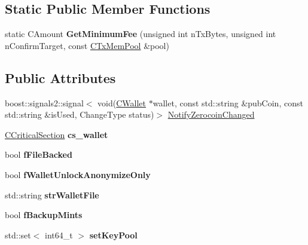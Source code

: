 \subsection*{Static Public Member Functions}
\begin{DoxyCompactItemize}
\item 
static C\+Amount {\bfseries Get\+Minimum\+Fee} (unsigned int n\+Tx\+Bytes, unsigned int n\+Confirm\+Target, const \mbox{\hyperlink{class_c_tx_mem_pool}{C\+Tx\+Mem\+Pool}} \&pool)
\end{DoxyCompactItemize}
\subsection*{Public Attributes}
\begin{DoxyCompactItemize}
\item 
boost\+::signals2\+::signal$<$ void(\mbox{\hyperlink{class_c_wallet}{C\+Wallet}} $\ast$wallet, const std\+::string \&pub\+Coin, const std\+::string \&is\+Used, Change\+Type status)$>$ \mbox{\hyperlink{class_c_wallet_a30f82cd0f9feac86cd2b64999be7f9d7}{Notify\+Zerocoin\+Changed}}
\item 
\mbox{\label{class_c_wallet_a4e6eb889f7638ed9695fdc0731581428}} 
\mbox{\hyperlink{class_annotated_mixin}{C\+Critical\+Section}} {\bfseries cs\+\_\+wallet}
\item 
\mbox{\label{class_c_wallet_a1b2e285b4d7bd105c792941aa666249c}} 
bool {\bfseries f\+File\+Backed}
\item 
\mbox{\label{class_c_wallet_add6767b414d652fc4acad99f4999d670}} 
bool {\bfseries f\+Wallet\+Unlock\+Anonymize\+Only}
\item 
\mbox{\label{class_c_wallet_a3e886f3a3b20228770e082b3fc014fc7}} 
std\+::string {\bfseries str\+Wallet\+File}
\item 
\mbox{\label{class_c_wallet_a680b2be3c0e8f173f6641f1689baf970}} 
bool {\bfseries f\+Backup\+Mints}
\item 
\mbox{\label{class_c_wallet_a363fabb2b82d596c33e4fa3920a11c26}} 
std\+::set$<$ int64\+\_\+t $>$ {\bfseries set\+Key\+Pool}
\item 
\mbox{\label{class_c_wallet_acfd09bc5a2daee930f9f988efac8dbb7}} 

\end{DoxyCompactItemize}
